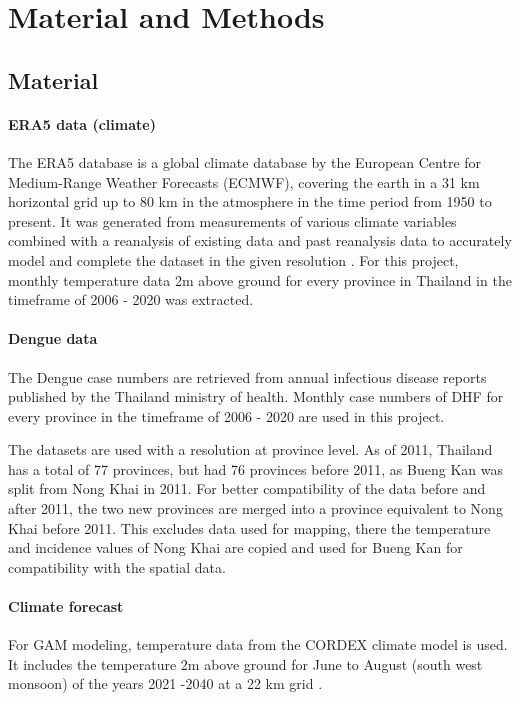 \section{Material and Methods}

\subsection{Material}

	\paragraph{ERA5 data (climate)}
	The ERA5 database is a global climate database by the European Centre for Medium-Range Weather Forecasts (ECMWF), covering the earth in a 31 km horizontal grid up to 80 km in the atmosphere in the time period from 1950 to present. It was generated from measurements of various climate variables combined with a reanalysis of existing data and past reanalysis data to accurately model and complete the dataset in the given resolution \citep{Hersbach2020}. For this project, monthly temperature data 2m above ground for every province in Thailand in the timeframe of 2006 - 2020 was extracted.
	\paragraph{Dengue data}
	The Dengue case numbers are retrieved from annual infectious disease reports published by the Thailand ministry of health. Monthly case numbers of DHF for every province in the timeframe of 2006 - 2020 are used in this project. 
	
	The datasets are used with a resolution at province level. As of 2011, Thailand has a total of 77 provinces, but had 76 provinces before 2011, as Bueng Kan was split from Nong Khai in 2011. For better compatibility of the data before and after 2011, the two new provinces are merged into a province equivalent to Nong Khai before 2011. This excludes data used for mapping, there the temperature and incidence values of Nong Khai are copied and used for Bueng Kan for compatibility with the spatial data. 
	
	\paragraph{Climate forecast}
	For GAM modeling, temperature  data from the CORDEX climate model is used. It includes the temperature 2m above ground for June to August (south west monsoon) of the years 2021 -2040 at a 22 km grid \citep{Copernicus2019}. 
